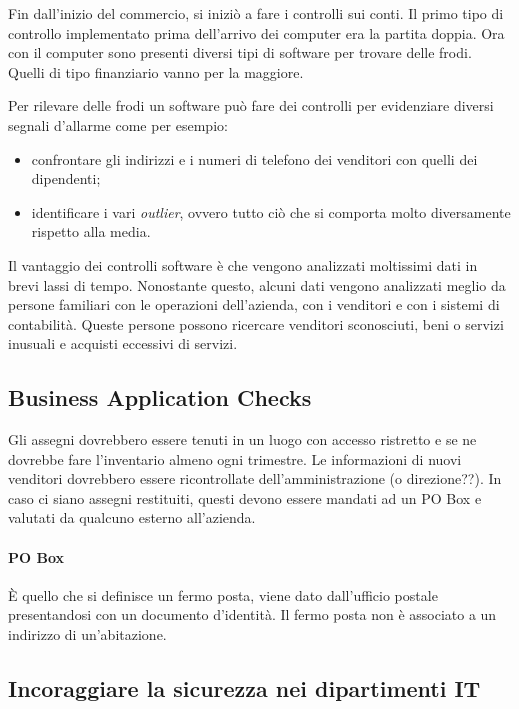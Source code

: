 Fin dall'inizio del commercio, si iniziò a fare i controlli sui conti. Il
primo tipo di controllo implementato prima dell'arrivo dei computer era la
partita doppia. Ora con il computer sono presenti diversi tipi di software
per trovare delle frodi. Quelli di tipo finanziario vanno per la maggiore.



Per rilevare delle frodi un software può fare dei controlli 
per evidenziare diversi segnali d'allarme come per esempio:
\begin{itemize}
\item confrontare gli indirizzi e i numeri di telefono dei venditori con
quelli dei dipendenti;
\item identificare i vari \textit{outlier}, ovvero tutto ciò che si
comporta molto diversamente rispetto alla media.
\end{itemize}
Il vantaggio dei controlli software è che vengono analizzati moltissimi
dati in brevi lassi di tempo. Nonostante questo, alcuni dati vengono 
analizzati meglio da persone familiari con le operazioni dell'azienda,
con i venditori e con i sistemi di contabilità. 
Queste persone possono ricercare venditori sconosciuti, beni o servizi
inusuali e acquisti eccessivi di servizi.

\subsection{Business Application Checks}
Gli assegni dovrebbero essere tenuti in un luogo con accesso ristretto e
se ne dovrebbe fare l'inventario almeno ogni trimestre.
Le informazioni di nuovi venditori dovrebbero essere ricontrollate
dell'amministrazione (o direzione??). In caso ci siano assegni restituiti,
questi devono essere mandati ad un PO Box e valutati da qualcuno esterno
all'azienda.

\paragraph*{PO Box}

È quello che si definisce un fermo posta, viene dato dall'ufficio postale
presentandosi con un documento d'identità. Il fermo posta non è associato a un
indirizzo di un'abitazione.

\subsection{Incoraggiare la sicurezza nei dipartimenti IT}

